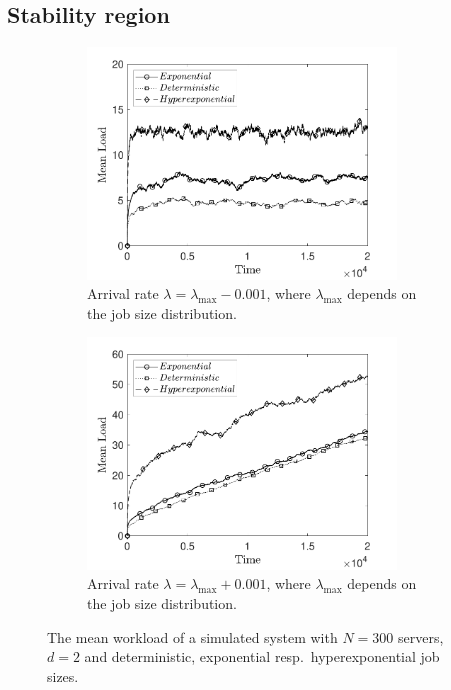 \documentclass[12pt]{report}
\begin{document}
\subsection{Stability region}\label{sec:verification_stability}
\begin{figure}[t]
\begin{subfigure}{.45\textwidth}
\begin{center}
\includegraphics[width=0.9\textwidth]{figures/Chapter3/plots_stable.pdf}
\caption{Arrival rate $\lambda = \lambda_{\max}-0.001$, where $\lambda_{\max}$ depends on the job size distribution.}
\label{fig:stab_ver1}
\end{center}
\end{subfigure}
\begin{subfigure}{.45\textwidth}
\begin{center}
\includegraphics[width=0.9\textwidth]{figures/Chapter3/plots_unstable.pdf}
\caption{Arrival rate $\lambda = \lambda_{\max}+0.001$, where $\lambda_{\max}$ depends on the job size distribution.}
\label{fig:stab_ver2}
\end{center}
\end{subfigure}
\caption{The mean workload of a simulated system with $N=300$ servers, $d=2$ and deterministic, exponential resp.~hyperexponential job sizes.}
\label{fig:stab_ver}
\end{figure}
\end{document}

